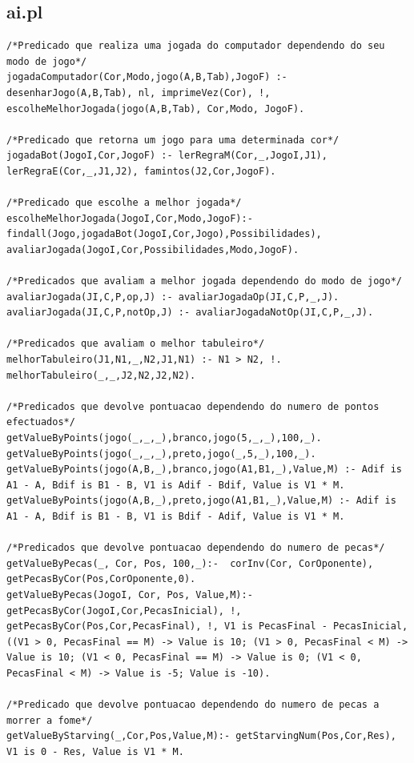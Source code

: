 \documentclass[a4paper]{article}
\begin{document}
\subsection{ai.pl}
\begin{lstlisting}
/*Predicado que realiza uma jogada do computador dependendo do seu modo de jogo*/
jogadaComputador(Cor,Modo,jogo(A,B,Tab),JogoF) :- desenharJogo(A,B,Tab), nl, imprimeVez(Cor), !, escolheMelhorJogada(jogo(A,B,Tab), Cor,Modo, JogoF).

/*Predicado que retorna um jogo para uma determinada cor*/
jogadaBot(JogoI,Cor,JogoF) :- lerRegraM(Cor,_,JogoI,J1), lerRegraE(Cor,_,J1,J2), famintos(J2,Cor,JogoF).

/*Predicado que escolhe a melhor jogada*/
escolheMelhorJogada(JogoI,Cor,Modo,JogoF):- findall(Jogo,jogadaBot(JogoI,Cor,Jogo),Possibilidades), avaliarJogada(JogoI,Cor,Possibilidades,Modo,JogoF).

/*Predicados que avaliam a melhor jogada dependendo do modo de jogo*/
avaliarJogada(JI,C,P,op,J) :- avaliarJogadaOp(JI,C,P,_,J).
avaliarJogada(JI,C,P,notOp,J) :- avaliarJogadaNotOp(JI,C,P,_,J).

/*Predicados que avaliam o melhor tabuleiro*/
melhorTabuleiro(J1,N1,_,N2,J1,N1) :- N1 > N2, !.
melhorTabuleiro(_,_,J2,N2,J2,N2).

/*Predicados que devolve pontuacao dependendo do numero de pontos efectuados*/
getValueByPoints(jogo(_,_,_),branco,jogo(5,_,_),100,_).
getValueByPoints(jogo(_,_,_),preto,jogo(_,5,_),100,_).
getValueByPoints(jogo(A,B,_),branco,jogo(A1,B1,_),Value,M) :- Adif is A1 - A, Bdif is B1 - B, V1 is Adif - Bdif, Value is V1 * M.
getValueByPoints(jogo(A,B,_),preto,jogo(A1,B1,_),Value,M) :- Adif is A1 - A, Bdif is B1 - B, V1 is Bdif - Adif, Value is V1 * M.

/*Predicados que devolve pontuacao dependendo do numero de pecas*/
getValueByPecas(_, Cor, Pos, 100,_):-  corInv(Cor, CorOponente), getPecasByCor(Pos,CorOponente,0).
getValueByPecas(JogoI, Cor, Pos, Value,M):- getPecasByCor(JogoI,Cor,PecasInicial), !, getPecasByCor(Pos,Cor,PecasFinal), !, V1 is PecasFinal - PecasInicial, ((V1 > 0, PecasFinal == M) -> Value is 10; (V1 > 0, PecasFinal < M) -> Value is 10; (V1 < 0, PecasFinal == M) -> Value is 0; (V1 < 0, PecasFinal < M) -> Value is -5; Value is -10).

/*Predicado que devolve pontuacao dependendo do numero de pecas a morrer a fome*/
getValueByStarving(_,Cor,Pos,Value,M):- getStarvingNum(Pos,Cor,Res), V1 is 0 - Res, Value is V1 * M.


\end{lstlisting}
\end{document}
